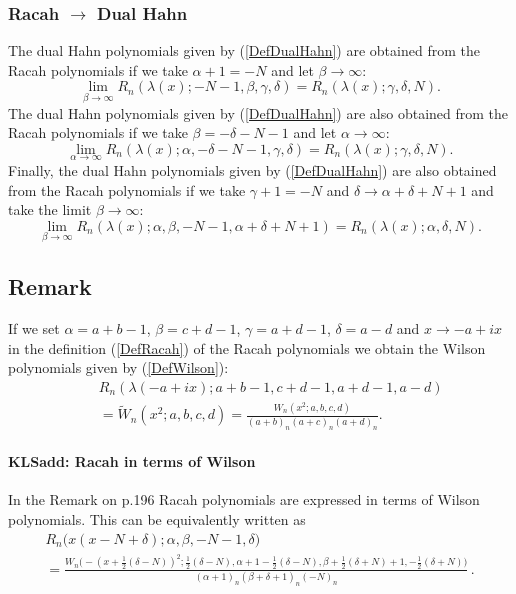\documentclass[envcountchap,graybox]{svmono}
\newcounter{rom}
\newcommand\al\alpha
\newcommand\be\beta
\newcommand\de\delta
\newcommand\half{\frac12}
\newcommand\thalf{\tfrac12}
\begin{document}
\subsubsection*{Racah $\rightarrow$ Dual Hahn}
The dual Hahn polynomials given by (\ref{DefDualHahn}) are obtained from the Racah polynomials
if we take $\alpha+1=-N$ and let $\beta\rightarrow\infty$:
\begin{equation}
\lim_{\beta\rightarrow\infty}
R_n(\lambda(x);-N-1,\beta,\gamma,\delta)=R_n(\lambda(x);\gamma,\delta,N).
\end{equation}
The dual Hahn polynomials given by (\ref{DefDualHahn}) are also obtained from the Racah polynomials
if we take $\beta=-\delta-N-1$ and let $\alpha\rightarrow\infty$:
\begin{equation}
\lim_{\alpha\rightarrow\infty}
R_n(\lambda(x);\alpha,-\delta-N-1,\gamma,\delta)=R_n(\lambda(x);\gamma,\delta,N).
\end{equation}
Finally, the dual Hahn polynomials given by (\ref{DefDualHahn}) are also obtained from the Racah polynomials
if we take $\gamma+1=-N$ and $\delta\rightarrow\alpha+\delta+N+1$ and take the limit $\beta\rightarrow\infty$:
\begin{equation}
\lim_{\beta\rightarrow\infty}
R_n(\lambda(x);\alpha,\beta,-N-1,\alpha+\delta+N+1)=R_n(\lambda(x);\alpha,\delta,N).
\end{equation}

\newpage

\subsection*{Remark}
If we set $\alpha=a+b-1$, $\beta=c+d-1$, $\gamma=a+d-1$, $\delta=a-d$ and $x\rightarrow
-a+ix$ in the definition (\ref{DefRacah}) of the Racah polynomials we obtain
the Wilson polynomials given by (\ref{DefWilson}):
\begin{eqnarray*}
& &R_n(\lambda(-a+ix);a+b-1,c+d-1,a+d-1,a-d)\\
& &{}=\tilde{W}_n(x^2;a,b,c,d)=\frac{W_n(x^2;a,b,c,d)}{(a+b)_n(a+c)_n(a+d)_n}.
\end{eqnarray*}
\paragraph{\large\bf KLSadd: Racah in terms of Wilson}In the Remark on p.196 Racah polynomials are expressed in terms of
Wilson polynomials. This can be equivalently written as
\begin{multline}
R_n\big(x(x-N+\de);\al,\be,-N-1,\de\big)\\
=\frac{W_n\big(-(x+\thalf(\de-N))^2;\thalf(\de-N),\al+1-\thalf(\de-N),
\be+\thalf(\de+N)+1,-\half(\de+N)\big)}
{(\al+1)_n (\be+\de+1)_n (-N)_n}\,.
\label{146}
\end{multline}
%
\end{document}
